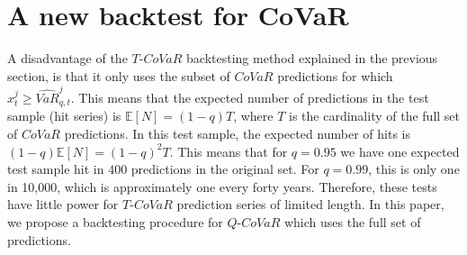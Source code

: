 \documentclass[12pt]{article}
\begin{document}
\section{A new backtest for CoVaR}  \label{backtnew}
A disadvantage of the $T$-$CoVaR$ backtesting method explained in the previous section, is that it only uses the subset of $CoVaR$ predictions for which $x^{j}_t\geq \widehat{VaR}_{q,t}^{j}$. This means that the expected number of predictions in the test sample (hit series) is $\mathbb{E}\left[N\right]=(1-q)T$, where $T$ is the cardinality of the full set of $CoVaR$ predictions. In this test sample, the expected number of hits is $(1-q)\mathbb{E}\left[N\right]=(1-q)^2T$. This means that for $q=0.95$ we have one expected test sample hit in $400$ predictions in the original set. For $q=0.99$, this is only one in 10,000, which is approximately one every forty years. Therefore, these tests have little power for $T$-$CoVaR$ prediction series of limited length. In this paper, we propose a backtesting procedure for $Q$-$CoVaR$ which uses the full set of predictions.
\end{document}
